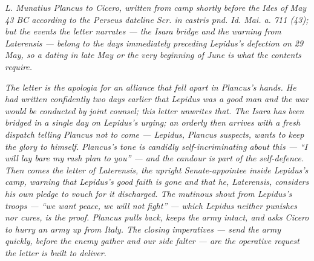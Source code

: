 
\textit{L. Munatius Plancus to Cicero, written from camp
shortly before the Ides of May 43 BC according to the
Perseus dateline \textit{Scr. in castris pnd. Id. Mai.
a. 711 (43)}; but the events the letter narrates ---
the Isara bridge and the warning from Laterensis ---
belong to the days immediately preceding Lepidus's
defection on 29 May, so a dating in late May or the very
beginning of June is what the contents require.}

\textit{The letter is the apologia for an alliance that
fell apart in Plancus's hands. He had written
confidently two days earlier that Lepidus was a good man
and the war would be conducted by joint counsel; this
letter unwrites that. The Isara has been bridged in a
single day on Lepidus's urging; an orderly then arrives
with a fresh dispatch telling Plancus \textit{not} to
come --- Lepidus, Plancus suspects, wants to keep the
glory to himself. Plancus's tone is candidly
self-incriminating about this --- ``I will lay bare my
rash plan to you'' --- and the candour is part of the
self-defence. Then comes the letter of Laterensis, the
upright Senate-appointee inside Lepidus's camp, warning
that Lepidus's good faith is gone and that he, Laterensis,
considers his own pledge to vouch for it discharged. The
mutinous shout from Lepidus's troops --- ``we want peace,
we will not fight'' --- which Lepidus neither punishes
nor cures, is the proof. Plancus pulls back, keeps the
army intact, and asks Cicero to hurry an army up from
Italy. The closing imperatives --- send the army quickly,
before the enemy gather and our side falter --- are the
operative request the letter is built to deliver.}
